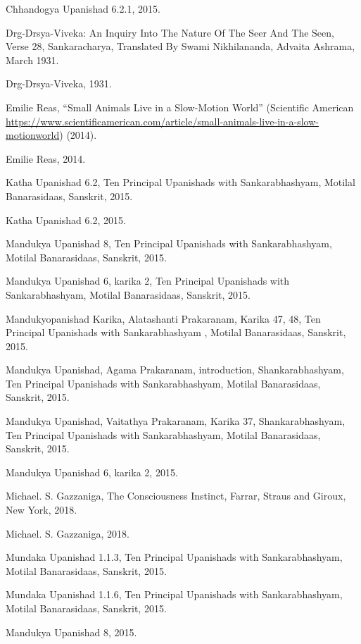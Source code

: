 \documentclass[twoside, 13pt]{article}
\begin{document}
{{{\begin{thebibliography}{99}
\bibitem{} Chhandogya Upanishad 6.2.1, 2015.

\bibitem{} Drg-Drsya-Viveka: An Inquiry Into The Nature Of The Seer And The Seen, Verse 28, Sankaracharya, Translated By Swami Nikhilananda, Advaita Ashrama, March 1931.

\bibitem{} Drg-Drsya-Viveka, 1931.

\bibitem{} Emilie Reas, “Small Animals Live in a Slow-Motion World” (Scientiﬁc American \url{https://www.scientiﬁcamerican.com/article/small-animals-live-in-a-slow-motionworld}) (2014). 

\bibitem{} Emilie Reas, 2014.

\bibitem{} Katha Upanishad 6.2, Ten Principal Upanishads with Sankarabhashyam, Motilal Banarasidaas, Sanskrit, 2015.

\bibitem{} Katha Upanishad 6.2, 2015.

\bibitem{} Mandukya Upanishad 8, Ten Principal Upanishads with Sankarabhashyam, Motilal Banarasidaas, Sanskrit, 2015.

\bibitem{} Mandukya Upanishad 6, karika 2, Ten Principal Upanishads with Sankarabhashyam, Motilal Banarasidaas, Sanskrit, 2015.

\bibitem{} Mandukyopanishad Karika, Alatashanti Prakaranam, Karika 47, 48, Ten Principal Upanishads with Sankarabhashyam , Motilal Banarasidaas, Sanskrit, 2015.

\bibitem{} Mandukya Upanishad, Agama Prakaranam, introduction, Shankarabhashyam, Ten Principal Upanishads with Sankarabhashyam, Motilal Banarasidaas, Sanskrit, 2015.

\bibitem{} Mandukya Upanishad, Vaitathya Prakaranam, Karika 37, Shankarabhashyam, Ten Principal Upanishads with Sankarabhashyam, Motilal Banarasidaas, Sanskrit, 2015.

\bibitem{} Mandukya Upanishad 6, karika 2, 2015.

\bibitem{} Michael. S. Gazzaniga, The Consciousness Instinct, Farrar, Straus and Giroux, New York, 2018.

\bibitem{} Michael. S. Gazzaniga, 2018.


\bibitem{} Mundaka Upanishad 1.1.3, Ten Principal Upanishads with Sankarabhashyam, Motilal Banarasidaas, Sanskrit, 2015.

\bibitem{} Mundaka Upanishad 1.1.6, Ten Principal Upanishads with Sankarabhashyam, Motilal Banarasidaas, Sanskrit, 2015.

\bibitem{} Mandukya Upanishad 8, 2015.


\end{thebibliography}}}}
\end{document}
